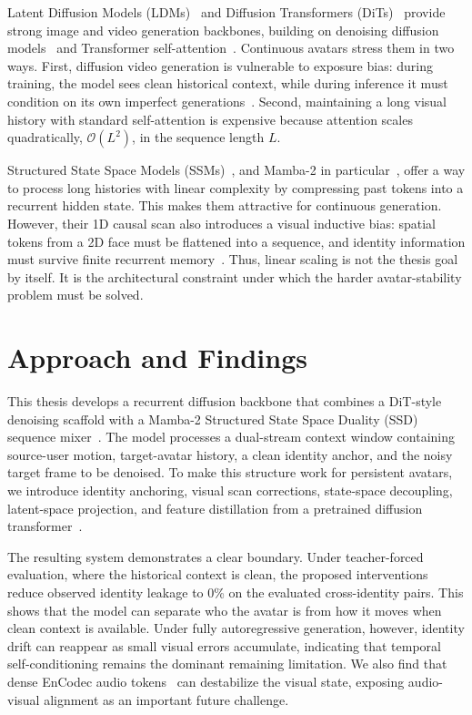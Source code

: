 \documentclass[12pt,letterpaper]{report}
\begin{document}
Latent Diffusion Models (LDMs)~\cite{rombach2022highresolution} and Diffusion Transformers (DiTs)~\cite{peebles2023scalable} provide strong image and video generation backbones, building on denoising diffusion models~\cite{ho2020denoising} and Transformer self-attention~\cite{vaswani2017attention}. Continuous avatars stress them in two ways. First, diffusion video generation is vulnerable to exposure bias: during training, the model sees clean historical context, while during inference it must condition on its own imperfect generations~\cite{bengio2015scheduled}. Second, maintaining a long visual history with standard self-attention is expensive because attention scales quadratically, $\mathcal{O}(L^2)$, in the sequence length $L$.

Structured State Space Models (SSMs)~\cite{gu2022efficiently}, and Mamba-2 in particular~\cite{dao2024transformers}, offer a way to process long histories with linear complexity by compressing past tokens into a recurrent hidden state. This makes them attractive for continuous generation. However, their 1D causal scan also introduces a visual inductive bias: spatial tokens from a 2D face must be flattened into a sequence, and identity information must survive finite recurrent memory~\cite{zhu2024vision, phung2024dimsum}. Thus, linear scaling is not the thesis goal by itself. It is the architectural constraint under which the harder avatar-stability problem must be solved.

\section{Approach and Findings}

This thesis develops a recurrent diffusion backbone that combines a DiT-style denoising scaffold with a Mamba-2 Structured State Space Duality (SSD) sequence mixer~\cite{dao2024transformers}. The model processes a dual-stream context window containing source-user motion, target-avatar history, a clean identity anchor, and the noisy target frame to be denoised. To make this structure work for persistent avatars, we introduce identity anchoring, visual scan corrections, state-space decoupling, latent-space projection, and feature distillation from a pretrained diffusion transformer~\cite{t2md2025}.

The resulting system demonstrates a clear boundary. Under teacher-forced evaluation, where the historical context is clean, the proposed interventions reduce observed identity leakage to 0\% on the evaluated cross-identity pairs. This shows that the model can separate who the avatar is from how it moves when clean context is available. Under fully autoregressive generation, however, identity drift can reappear as small visual errors accumulate, indicating that temporal self-conditioning remains the dominant remaining limitation. We also find that dense EnCodec audio tokens~\cite{defossez2023high} can destabilize the visual state, exposing audio-visual alignment as an important future challenge.
\end{document}
